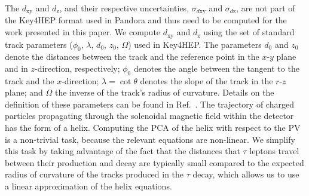 \documentclass[a4paper,english,11pt]{article}
\newcommand{\Pgt}{\ensuremath{\tau}\xspace}
\newcommand{\dxy}{\ensuremath{d_{\textrm{xy}}}\xspace}
\newcommand{\sigmaxy}{\ensuremath{\sigma_{d{\textrm{xy}}}}\xspace}
\newcommand{\dz}{\ensuremath{d_{\textrm{z}}}\xspace}
\newcommand{\sigmaz}{\ensuremath{\sigma_{d{\textrm{z}}}}\xspace}
\begin{document}
	The $\dxy$ and $\dz$, and their respective uncertainties, $\sigmaxy$ and $\sigmaz$, are not part of the Key4HEP format used in Pandora and thus need to be computed for the work presented in this paper.
	We compute $\dxy$ and $\dz$ using the set of standard track parameters ($\phi_{0},\,\lambda,\,d_{0},\,z_{0},\,\Omega$) used in Key4HEP.
	The parameters $d_{0}$ and $z_{0}$ denote the distances between the track and the reference point in the $x$-$y$ plane and in $z$-direction, respectively; $\phi_{0}$ denotes the angle between the tangent to the track and the $x$-direction;
	$\lambda= \cot\theta$ denotes the slope of the track in the $r$-$z$ plane; and $\Omega$ the inverse of the track's radius of curvature. Details on the definition of these parameters can be found in Ref.~\cite{Kramer:2006zz}. The trajectory of charged particles propagating through the solenoidal magnetic field within the detector has the form of a helix. Computing the PCA of the helix with respect to the PV is a non-trivial task, because the relevant equations are non-linear.
	We simplify this task by taking advantage of the fact that the distances that $\Pgt$ leptons travel between their production and decay are typically small compared to the expected radius of curvature of the tracks produced in the $\Pgt$ decay, which allows us to use a linear approximation of the helix equations.
\end{document}
